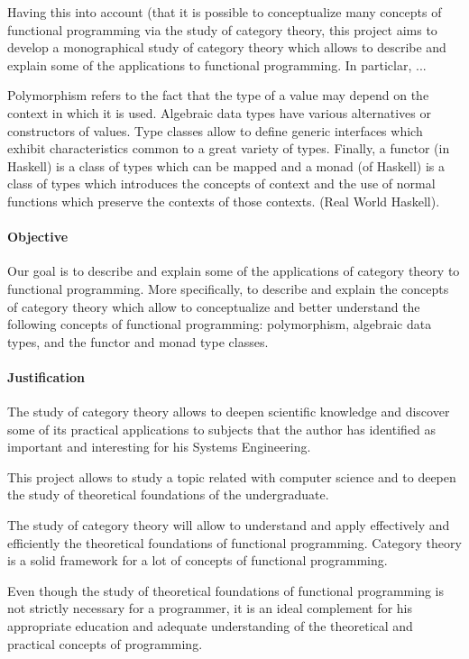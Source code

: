 Having this into account (that it is possible to conceptualize many
concepts of functional programming via the study of category theory,
this project aims to develop a monographical study of category theory
which allows to describe and explain some of the applications to
functional programming. In particlar, ...

Polymorphism refers to the fact that the type of a value may depend on
the context in which it is used. Algebraic data types have various
alternatives or constructors of values. Type classes allow to define
generic interfaces which exhibit characteristics common to a great
variety of types. Finally, a functor (in Haskell) is a class of types
which can be mapped and a monad (of Haskell) is a class of types which
introduces the concepts of context and the use of normal functions
which preserve the contexts of those contexts. (Real World Haskell).


\paragraph{Objective}

Our goal is to describe and explain some of the applications of
category theory to functional programming. More specifically, to
describe and explain the concepts of category theory which allow to
conceptualize and better understand the following concepts of
functional programming: polymorphism, algebraic data types, and the
functor and monad type classes.

\paragraph{Justification}

The study of category theory allows to deepen scientific knowledge and
discover some of its practical applications to subjects that the
author has identified as important and interesting for his Systems
Engineering.

This project allows to study a topic related with computer science and
to deepen the study of theoretical foundations of the undergraduate.

The study of category theory will allow to understand and apply
effectively and efficiently the theoretical foundations of functional
programming. Category theory is a solid framework for a lot of
concepts of functional programming.

Even though the study of theoretical foundations of functional
programming is not strictly necessary for a programmer, it is an ideal
complement for his appropriate education and adequate understanding of
the theoretical and practical concepts of programming.

